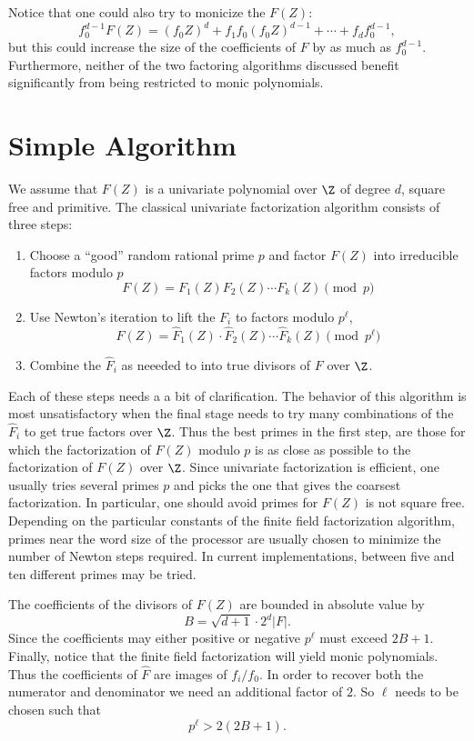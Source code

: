 Notice that one could also try to monicize the $F(Z)$:
\[
f_0^{d-1}F(Z) = (f_0 Z)^d + f_1 f_0 (f_0 Z)^{d-1} + \cdots + f_d
f_0^{d-1},
\]
but this could increase the size of the coefficients of $F$ by as much
as $f_0^{d-1}$.  Furthermore, neither of the two factoring algorithms
discussed benefit significantly from being restricted to monic
polynomials.

\section{Simple Algorithm}
\label{UF:Simple:Sec}

We assume that $F(Z)$ is a univariate polynomial over $\Z$ of degree
$d$, square free and primitive.  The classical univariate
factorization algorithm consists of three steps:
\begin{enumerate}
\item Choose a ``good'' random rational prime $p$ and factor $F(Z)$
into irreducible factors modulo $p$ 
\[
F(Z) = F_1(Z) F_2(Z) \cdots F_k(Z) \pmod{p}
\]

\item Use Newton's iteration to lift the $F_i$ to factors modulo
$p^{\ell}$,
\[
F(Z) = \hat{F}_1(Z) \cdot \hat{F}_2(Z) \cdots \hat{F}_k(Z)
\pmod{p^{\ell}}
\]

\item Combine the $\hat{F}_i$ as neeeded to into true divisors of $F$
over $\Z$.
\end{enumerate}

Each of these steps needs a a bit of clarification.  The behavior of
this algorithm is most unsatisfactory when the final stage needs to
try many combinations of the $\hat{F}_i$ to get true factors over
$\Z$. Thus the best primes in the first step, are those for which the
factorization of $F(Z)$ modulo $p$ is as close as possible to the
factorization of $F(Z)$ over $\Z$.  Since univariate factorization is
efficient, one usually tries several primes $p$ and picks the one
that gives the coarsest factorization.  In particular, one should
avoid primes for $F(Z)$ is not square free.  Depending on the
particular constants of the finite field factorization algorithm,
primes near the word size of the processor are usually chosen to
minimize the number of Newton steps required.  In current
implementations, between five and ten different primes may be tried.

The coefficients of the divisors of $F(Z)$ are bounded in absolute
value by
\[
B = \sqrt{d+1} \cdot 2^d |F|.
\]
Since the coefficients may either positive or negative $p^{\ell}$ must
exceed $2B+1$.  Finally, notice that the finite field factorization
will yield monic polynomials.  Thus the coefficients of $\hat{F}$ are
images of $f_i/f_0$.  In order to recover both the numerator and
denominator we need an additional factor of $2$.  So $\ell$ needs to
be chosen such that
\[
p^{\ell} > 2(2B+1).
\]

